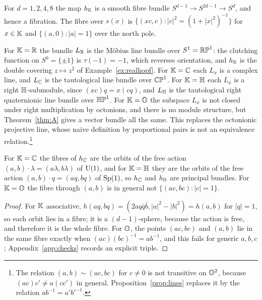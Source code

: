 \begin{corollary}\label{cor:fibration}
For $d=1,2,4,8$ the map $h_{\mathbb{K}}$ is a smooth fibre bundle $S^{d-1}\to S^{2d-1}\to S^d$, and hence a fibration. The fibre over $s(x)$ is $\{(xc,c):|c|^2=(1+|x|^2)^{-1}\}$ for $x\in\mathbb{K}$ and $\{(a,0):|a|=1\}$ over the north pole.
\end{corollary}

\begin{remark}\label{rem:fourcases}
For $\mathbb{K}=\mathbb{R}$ the bundle $L_{\mathbb{R}}$ is the M\"obius line bundle over $S^1=\mathbb{RP}^1$: the clutching function on $S^0=\{\pm1\}$ is $\tau(-1)=-1$, which reverses orientation, and $h_{\mathbb{R}}$ is the double covering $z\mapsto z^2$ of Example~\ref{ex:realhopf}. For $\mathbb{K}=\mathbb{C}$ each $L_x$ is a complex line, and $L_{\mathbb{C}}$ is the tautological line bundle over $\mathbb{CP}^1$. For $\mathbb{K}=\mathbb{H}$ each $L_x$ is a right $\mathbb{H}$-submodule, since $(xc)q=x(cq)$, and $L_{\mathbb{H}}$ is the tautological right quaternionic line bundle over $\mathbb{HP}^1$. For $\mathbb{K}=\mathbb{O}$ the subspace $L_x$ is not closed under right multiplication by octonions, and there is no module structure, but Theorem~\ref{thm:A} gives a vector bundle all the same. This replaces the octonionic projective line, whose naive definition by proportional pairs is not an equivalence relation.\footnote{The relation $(a,b)\sim(ac,bc)$ for $c\neq0$ is not transitive on $\mathbb{O}^2$, because $(ac)c'\neq a(cc')$ in general. Proposition~\ref{prop:lines} replaces it by the relation $ab^{-1}=a'b'^{-1}$.}
\end{remark}

\begin{proposition}\label{prop:actions}
For $\mathbb{K}=\mathbb{C}$ the fibres of $h_{\mathbb{C}}$ are the orbits of the free action $(a,b)\cdot\lambda=(a\lambda,b\lambda)$ of $\mathrm{U}(1)$, and for $\mathbb{K}=\mathbb{H}$ they are the orbits of the free action $(a,b)\cdot q=(aq,bq)$ of $\mathrm{Sp}(1)$, so $h_{\mathbb{C}}$ and $h_{\mathbb{H}}$ are principal bundles. For $\mathbb{K}=\mathbb{O}$ the fibre through $(a,b)$ is in general not $\{(ac,bc):|c|=1\}$.
\end{proposition}

\begin{proof}
For $\mathbb{K}$ associative, $h(aq,bq)=(2aq\bar q\bar b,|a|^2-|b|^2)=h(a,b)$ for $|q|=1$, so each orbit lies in a fibre; it is a $(d-1)$-sphere, because the action is free, and therefore it is the whole fibre. For $\mathbb{O}$, the points $(ac,bc)$ and $(a,b)$ lie in the same fibre exactly when $(ac)(bc)^{-1}=ab^{-1}$, and this fails for generic $a,b,c$; Appendix~\ref{app:checks} records an explicit triple.
\end{proof}

